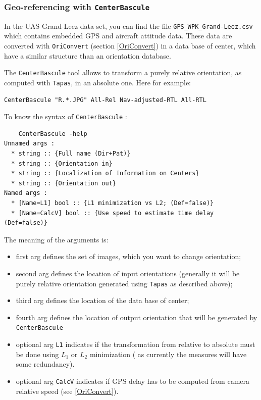
			
\subsubsection{Geo-referencing with {\tt CenterBascule}}\label{Sec:CenterBascule}


In the UAS Grand-Leez data set, you can find the file {\tt GPS\_WPK\_Grand-Leez.csv} which contains embedded GPS and aircraft attitude data. These data are converted with {\tt OriConvert} (section \ref{OriConvert}) in a data base of center, which have a similar structure than an orientation database.

The {\tt CenterBascule} tool allows to transform a purely relative orientation,
as computed with {\tt Tapas}, in an absolute one. Here for example:

\begin{verbatim}
CenterBascule "R.*.JPG" All-Rel Nav-adjusted-RTL All-RTL
\end{verbatim}

To know the syntax of {\tt CenterBascule} :
\begin{verbatim}
	CenterBascule -help
Unnamed args : 
  * string :: {Full name (Dir+Pat)}
  * string :: {Orientation in}
  * string :: {Localization of Information on Centers}
  * string :: {Orientation out}
Named args : 
  * [Name=L1] bool :: {L1 minimization vs L2; (Def=false)}
  * [Name=CalcV] bool :: {Use speed to estimate time delay (Def=false)}
\end{verbatim}

The meaning of the arguments is:

\begin{itemize}
  \item  first arg defines the set of images, which you want to change orientation;
  \item  second arg defines the location of input orientations (generally it will be purely relative
         orientation generated using {\tt Tapas} as described above);
  \item third arg defines the location of the data base of center;
  \item fourth arg defines the location of output orientation that will be generated by {\tt CenterBascule}
  \item optional arg {\tt L1} indicates if the transformation from relative to absolute
         must be done using $L_1$ or $L_2$ minimization ( as currently the  measures 
         will have some redundancy).
	\item optional arg {\tt CalcV} indicates if GPS delay has to be computed from camera relative speed (see \ref{OriConvert}).
\end{itemize}


